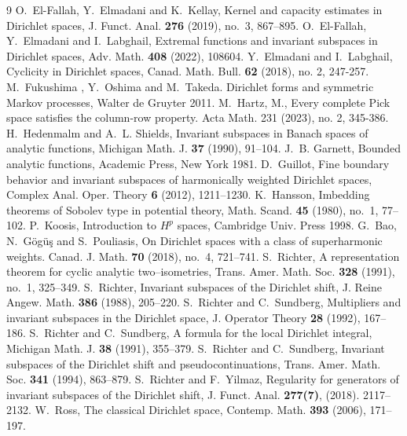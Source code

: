 \documentclass[12pt,reqno,a4paper]{amsart}
\numberwithin{equation}{section}
\begin{document}
\begin{thebibliography}{9}
		O.~El-Fallah, Y.~Elmadani and K.~Kellay,
		Kernel and capacity estimates in Dirichlet spaces,
		J. Funct. Anal. \textbf{276} (2019), no.~3, 867--895.
		O.~El-Fallah, Y.~Elmadani and I.~Labghail,
		Extremal functions and invariant subspaces in Dirichlet spaces, Adv. Math. \textbf{408} (2022), 108604.
		Y.~Elmadani and I.~Labghail,
		Cyclicity in Dirichlet spaces, Canad. Math. Bull. \textbf{62} (2018), no. 2, 247-257.
		M.~Fukushima , Y.~Oshima and M.~Takeda. 
		Dirichlet forms and symmetric Markov processes, Walter de Gruyter 2011.
		 M.~Hartz, M., 
		Every complete Pick space satisfies the column-row property. 
		Acta Math. 231 (2023), no. 2, 345-386.
		H.~Hedenmalm and A.~L. Shields,
		Invariant subspaces in Banach spaces of analytic functions, Michigan Math. J. \textbf{37} (1990), 91--104.
		J.~B. Garnett, Bounded analytic functions,
		Academic Press, New York 1981.
		D.~Guillot,
		Fine boundary behavior and invariant subspaces of harmonically weighted Dirichlet spaces, Complex Anal. Oper. Theory \textbf{6} (2012), 1211--1230.
		K.~Hansson,
		Imbedding theorems of Sobolev type in potential theory, Math. Scand. \textbf{45} (1980), no.~1, 77--102.
		P.~Koosis, Introduction to $H^p$ spaces,
		Cambridge Univ. Press 1998.
		G.~Bao, N.~G\"og\"u\c{s} and S.~Pouliasis, On Dirichlet spaces with a class of superharmonic weights. Canad. J. Math. \textbf{70} (2018), no.~4, 721--741.
		S.~Richter,
		A representation theorem for cyclic analytic two--isometries, Trans. Amer. Math. Soc. \textbf{328} (1991), no.~1, 325--349.
		S.~Richter,
		Invariant subspaces of the Dirichlet shift, J. Reine Angew. Math. \textbf{386} (1988), 205--220.
		S.~Richter and C.~Sundberg,
		Multipliers and invariant subspaces in the Dirichlet space, J. Operator Theory \textbf{28} (1992), 167--186.
		S.~Richter and C.~Sundberg,
		A formula for the local Dirichlet integral, Michigan Math. J. \textbf{38} (1991), 355--379.
		S.~Richter and C.~Sundberg,
		Invariant subspaces of the Dirichlet shift and pseudocontinuations, Trans. Amer. Math. Soc. \textbf{341} (1994), 863--879.
		S.~Richter and F.~Yilmaz,
		Regularity for generators of invariant subspaces of the Dirichlet shift, J. Funct. Anal. \textbf{277(7)},  (2018). 2117--2132.
		W.~Ross,
		The classical Dirichlet space, Contemp. Math. \textbf{393} (2006), 171-- 197.

\end{thebibliography}
\end{document}
